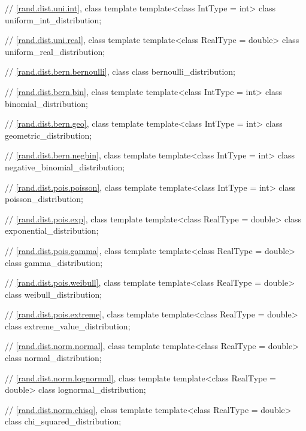 \begin{codeblock}
{  // \ref{rand.dist.uni.int}, class template 
  template<class IntType = int>
    class uniform_int_distribution;

  // \ref{rand.dist.uni.real}, class template 
  template<class RealType = double>
    class uniform_real_distribution;

  // \ref{rand.dist.bern.bernoulli}, class 
  class bernoulli_distribution;

  // \ref{rand.dist.bern.bin}, class template 
  template<class IntType = int>
    class binomial_distribution;

  // \ref{rand.dist.bern.geo}, class template 
  template<class IntType = int>
    class geometric_distribution;

  // \ref{rand.dist.bern.negbin}, class template 
  template<class IntType = int>
    class negative_binomial_distribution;

  // \ref{rand.dist.pois.poisson}, class template 
  template<class IntType = int>
    class poisson_distribution;

  // \ref{rand.dist.pois.exp}, class template 
  template<class RealType = double>
    class exponential_distribution;

  // \ref{rand.dist.pois.gamma}, class template 
  template<class RealType = double>
    class gamma_distribution;

  // \ref{rand.dist.pois.weibull}, class template 
  template<class RealType = double>
    class weibull_distribution;

  // \ref{rand.dist.pois.extreme}, class template 
  template<class RealType = double>
    class extreme_value_distribution;

  // \ref{rand.dist.norm.normal}, class template 
  template<class RealType = double>
    class normal_distribution;

  // \ref{rand.dist.norm.lognormal}, class template 
  template<class RealType = double>
    class lognormal_distribution;

  // \ref{rand.dist.norm.chisq}, class template 
  template<class RealType = double>
    class chi_squared_distribution;

}
\end{codeblock}
